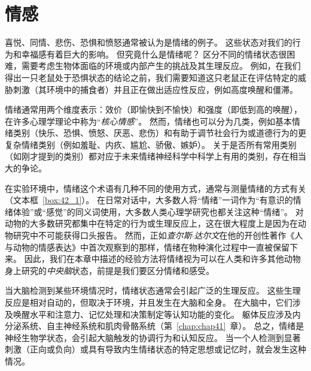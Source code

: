 \chapter{情感} \label{chap:chap42}

喜悦、同情、悲伤、恐惧和愤怒通常被认为是情绪的例子。
这些状态对我们的行为和幸福感有着巨大的影响。
但究竟什么是情绪呢？
区分不同的情绪状态很困难，需要考虑生物体面临的环境或内部产生的挑战及其生理反应。
例如，在我们得出一只老鼠处于恐惧状态的结论之前，我们需要知道这只老鼠正在评估特定的威胁刺激（其环境中的捕食者）并且正在做出适应性反应，例如高度唤醒和僵滞。


情绪通常用两个维度表示：效价（即愉快到不愉快）和强度（即低到高的唤醒），在许多心理学理论中称为“\textit{核心情感}”。
然而，情绪也可以分为几类，例如基本情绪类别（快乐、恐惧、愤怒、厌恶、悲伤）和有助于调节社会行为或道德行为的更复杂情绪类别（例如羞耻、内疚、尴尬、骄傲、嫉妒）。
关于是否所有常用类别（如刚才提到的类别）都对应于未来情绪神经科学中科学上有用的类别，存在相当大的争论。


在实验环境中，情绪这个术语有几种不同的使用方式，通常与测量情绪的方式有关（文本框~\ref{box:42_1}）。
在日常对话中，大多数人将“情绪”一词作为“有意识的情绪体验”或“感觉”的同义词使用，大多数人类心理学研究也都关注这种“情绪”。
对动物的大多数研究都集中在特定的行为或生理反应上，这在很大程度上是因为在动物研究中不可能获得口头报告。
然而，正如\textit{查尔斯$\cdot$达尔文}在他的开创性著作《人与动物的情感表达》中首次观察到的那样，情绪在物种演化过程中一直被保留下来。
因此，我们在本章中描述的经验方法将情绪视为可以在人类和许多其他动物身上研究的\textit{中央脑}状态，前提是我们要区分情绪和感受。


当大脑检测到某些环境情况时，情绪状态通常会引起广泛的生理反应。
这些生理反应是相对自动的，但取决于环境，并且发生在大脑和全身。
在大脑中，它们涉及唤醒水平和注意力、记忆处理和决策制定等认知功能的变化。
躯体反应涉及内分泌系统、自主神经系统和肌肉骨骼系统（第~\ref{chap:chap41}~章）。
总之，情绪是神经生物学状态，会引起大脑触发的协调行为和认知反应。
当一个人检测到显著刺激（正向或负向）或具有导致内生情绪状态的特定思想或记忆时，就会发生这种情况。


